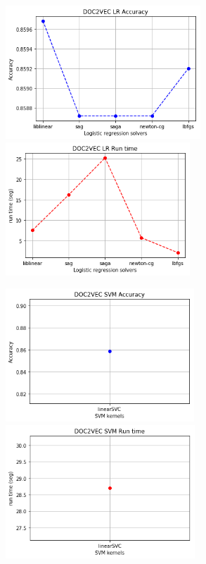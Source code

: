 \documentclass[oneside,onecolumn]{article}
\begin{document}
\begin{figure}[H]
	\centering
	
	\includegraphics[height=5cm]{report_plot/plot_doc2vec/logistic_regression_accuracy.png}
	\includegraphics[height=5cm]{report_plot/plot_doc2vec/logistic_regression_runtime.png}
	
	\includegraphics[height=5cm]{report_plot/plot_doc2vec/svm_accuracy.png}
	\includegraphics[height=5cm]{report_plot/plot_doc2vec/svm_runtime.png}
	

\end{figure}
\end{document}
